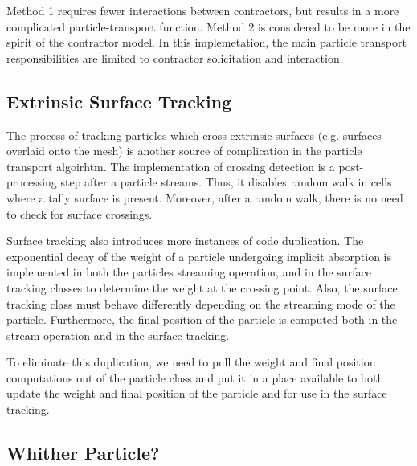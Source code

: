 \documentclass[memo]{ResearchNote}
\begin{document}
Method 1 requires fewer interactions between contractors, but results
in a more complicated particle-transport function. Method 2 is
considered to be more in the spirit of the contractor model. In this
implemetation, the main particle transport responsibilities are
limited to contractor solicitation and interaction. 

\subsection{Extrinsic Surface Tracking} \label{sec:surface_tracking}

The process of tracking particles which cross extrinsic surfaces
(e.g. surfaces overlaid onto the mesh) is another source of
complication in the particle transport algoirhtm. The implementation
of crossing detection is a post-processing step after a particle
streams. Thus, it disables random walk in cells where a tally surface
is present. Moreover, after a random walk, there is no need to check
for surface crossings.

Surface tracking also introduces more instances of code duplication.
The exponential decay of the weight of a particle undergoing implicit
absorption is implemented in both the particles streaming operation,
and in the surface tracking classes to determine the weight at the
crossing point. Also, the surface tracking class must behave
differently depending on the streaming mode of the
particle. Furthermore, the final position of the particle is computed
both in the stream operation and in the surface tracking.

To eliminate this duplication, we need to pull the weight and final
position computations out of the particle class and put it in a place
available to both update the weight and final position of the particle
and for use in the surface tracking. 

\subsection{Whither Particle?}
\end{document}
